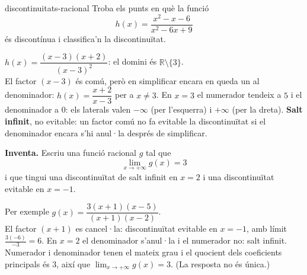 \begin{apartats}
\begin{tria}{discontinuitats-racional}
Troba els punts en què la funció
\[
h(x)=\frac{x^2-x-6}{x^2-6x+9}
\]
és discontínua i classifica'n la discontinuïtat.

\begin{solucio}
$h(x)=\dfrac{(x-3)(x+2)}{(x-3)^2}$: el domini és $\mathbb{R}\setminus\{3\}$.\\
El factor $(x-3)$ és comú, però en simplificar encara en queda un al denominador:
$h(x)=\dfrac{x+2}{x-3}$ per a $x\ne3$. En $x=3$ el numerador tendeix a $5$ i el denominador a
$0$: els laterals valen $-\infty$ (per l'esquerra) i $+\infty$ (per la dreta).
\textbf{Salt infinit}, no evitable: un factor comú no fa evitable la discontinuïtat si el
denominador encara s'hi anul·la després de simplificar.
\end{solucio}
\end{tria}

\begin{nomesllarg}
\textbf{Inventa.} Escriu una funció racional $g$ tal que
\[
\lim_{x\to+\infty}g(x)=3
\]
i que tingui una discontinuïtat de salt infinit en $x=2$ i una discontinuïtat evitable en
$x=-1$.

\begin{solucio}
Per exemple $g(x)=\dfrac{3(x+1)(x-5)}{(x+1)(x-2)}$.\\
El factor $(x+1)$ es cancel·la: discontinuïtat evitable en $x=-1$, amb límit
$\frac{3(-6)}{-3}=6$. En $x=2$ el denominador s'anul·la i el numerador no: salt infinit.
Numerador i denominador tenen el mateix grau i el quocient dels coeficients principals
és $3$, així que $\lim_{x\to+\infty}g(x)=3$. (La resposta no és única.)
\end{solucio}
\end{nomesllarg}

\end{apartats}
